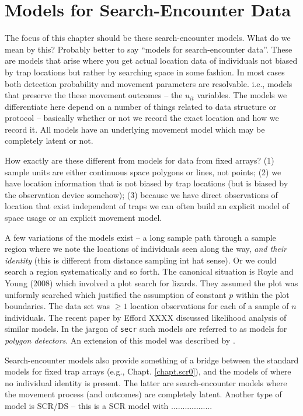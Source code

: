 \chapter{Models for  Search-Encounter Data}
\label{chapt.searchencounter}

\vspace{0.3cm}



The focus of this chapter should be these search-encounter models.
What do we mean by this? Probably better to say ``models for
search-encounter data''. These are models that arise where you get
actual location data of individuals not biased by trap locations but
rather by searching space in some fashion. In most cases both
detection probability and movement parameters are resolvable. i.e.,
models that preserve the these movement outcomes -- the $u_{it}$ variables.
The models we differentiate here depend on a number of
things related to data structure or protocol -- basically whether or
not we record the exact location and how we record it. All models have
an underlying movement model which may be completely latent or not.

How exactly
are these different from models for data from fixed arrays?  (1)
sample units are either continuous space polygons or lines, not
points; (2) we have location information that is not biased by trap
locations (but is biased by the observation device somehow); (3)
because we have direct observations of location that exist independent
of traps we can often build an explicit model of space usage or an
explicit movement model.

A few variations of the models exist -- a long sample path through a
sample region where we note the locations of individuals seen along
the way, {\it and their identity} (this is different from distance
sampling int hat sense). Or we could search a region systematically
and so forth.  
The canonical situation is Royle and Young (2008) which involved a
plot search for lizards. They assumed the plot was uniformly searched
which justified the assumption of constant $p$ within the plot
boundaries. The data set was $\ge 1$ location observations for each of
a sample of $n$ individuals. 
The recent paper by Efford XXXX
discussed likelihood analysis of similar models. In the jargon of
\mbox{\tt secr} such models are referred to as models for {\it polygon detectors}.
 An extension of this model was described
by \citep{royle_etal:2011mee}.  

Search-encounter models also provide something of a bridge between the
standard models for fixed trap arrays (e.g., Chapt. \ref{chapt.scr0}),
and the models of \citep{chandler_royle:2012} where no individual
identity is present. The latter are search-encounter models where the
movement process (and outcomes) are completely latent. Another type of
model is SCR/DS -- this is a SCR model with ..................

